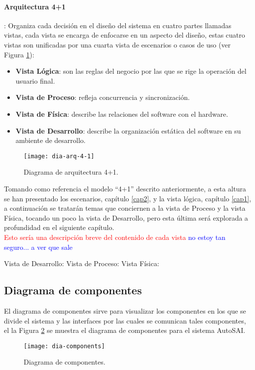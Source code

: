 \paragraph*{Arquitectura 4+1}: Organiza cada decisión en el diseño del sistema en cuatro partes llamadas vistas, cada vista se encarga de enfocarse en un aspecto del diseño, estas cuatro vistas son unificadas por una cuarta vista de escenarios o casos de uso (ver Figura \ref{fig:dia-arq-4-1}):
\begin{itemize}
	\item \textbf{Vista Lógica}: son las reglas del negocio por las que se rige la operación del usuario final.
	\item \textbf{Vista de Proceso}: refleja concurrencia y sincronización.
	\item \textbf{Vista de Física}: describe las relaciones del software con el hardware.
	\item \textbf{Vista de Desarrollo}: describe la organización estática del software en su ambiente de desarrollo.\cite{ViewModel4plus1}
\end{itemize}

\begin{figure}[h]
\centering
\texttt{[image: dia-arq-4-1]} 
\caption{Diagrama de arquitectura 4+1.}
\label{fig:dia-arq-4-1}
\end{figure}

Tomando como referencia el modelo ``4+1'' descrito anteriormente, a esta altura se han presentado los escenarios, capítulo \ref{cap2}, y la vista lógica, capítulo \ref{cap1}, a continuación se tratarán temas que conciernen a la vista de Proceso y la vista Física, tocando un poco la vista de Desarrollo, pero esta última será explorada a profundidad en el siguiente capítulo.\\

\textcolor{red}{Esto sería una descripción breve del contenido de cada vista}
\textcolor{blue}{no estoy tan seguro... a ver que sale}

Vista de Desarrollo:
Vista de Proceso:
Vista Física:

\subsection{Diagrama de componentes}

El diagrama de componentes sirve para visualizar los componentes en los que se divide el sistema y las interfaces por las cuales se comunican tales componentes, el la Figura \ref{fig:dia-components} se muestra el diagrama de componentes para el sistema AutoSAI.
\begin{figure}[h]
\centering
\texttt{[image: dia-components]}
\caption{Diagrama de componentes.}
\label{fig:dia-components}
\end{figure}


